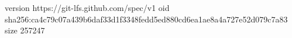 version https://git-lfs.github.com/spec/v1
oid sha256:ca4c79c07a439b6daf33d1f3348fedd5ed880cd6ea1ae8a4a727e52d079c7a83
size 257247
